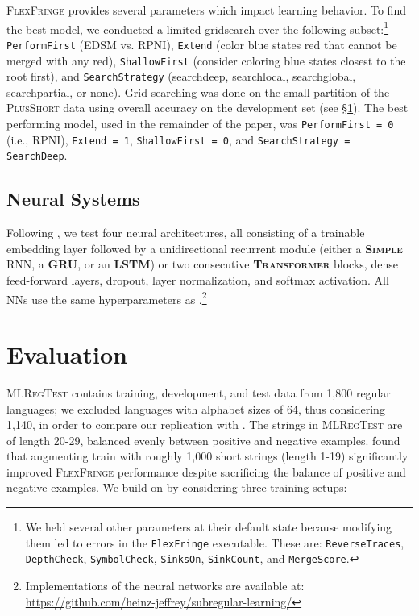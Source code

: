 \documentclass[11pt]{article}
\begin{document}
\textsc{FlexFringe}  provides several  parameters which impact learning behavior. To find the best model, we conducted a limited gridsearch over the following subset:\footnote{We held several other parameters at their default state because modifying them led to errors in the \texttt{FlexFringe} executable. These are: \texttt{ReverseTraces}, \texttt{DepthCheck}, \texttt{SymbolCheck}, \texttt{SinksOn}, \texttt{SinkCount}, and \texttt{MergeScore}.}
\texttt{PerformFirst} (EDSM vs. RPNI),  
\texttt{Extend} (color blue states red that cannot be merged with any red), 
\texttt{ShallowFirst} (consider coloring blue states closest to the root first), and 
\texttt{SearchStrategy} (searchdeep, searchlocal, searchglobal, searchpartial, or none). 
Grid searching was done on the small partition of the \textsc{PlusShort} data using overall accuracy on the development set (see \S \ref{sec:eval}). 
The best performing model, used in the remainder of the paper, was \texttt{PerformFirst = 0} (i.e., RPNI), \texttt{Extend = 1}, \texttt{ShallowFirst = 0}, and \texttt{SearchStrategy = SearchDeep}. 


\subsection{Neural Systems}
Following \citet{mlregtest}, we test four neural architectures, all consisting of a trainable embedding layer followed by a unidirectional recurrent module (either a \textbf{\textsc{Simple}} RNN, a \textbf{GRU}, or an \textbf{LSTM}) or two consecutive \textbf{\textsc{Transformer}} blocks, dense feed-forward layers, dropout, layer normalization, and softmax activation. 
All NNs use the same hyperparameters as \citeauthor{mlregtest}.\footnote{Implementations of the neural networks are available at: \href{https://github.com/heinz-jeffrey/subregular-learning/}{https://github.com/heinz-jeffrey/subregular-learning/}}

\section{Evaluation}\label{sec:eval}

\textsc{MLRegTest} \citep{mlregtest} contains training, development, and test data from 1,800 regular languages; we excluded languages with alphabet sizes of 64, thus considering 1,140, in order to compare our replication with \citet{adil23}. 
The strings in \textsc{MLRegTest} are of length 20-29, balanced evenly between positive and negative examples.
\citeauthor{adil23} found that augmenting train with roughly 1,000 short strings (length 1-19) significantly improved \textsc{FlexFringe} performance despite sacrificing the balance of positive and negative examples.
We build on \citeauthor{adil23} by considering three training setups:
\vspace{-0.8em}
\end{document}
